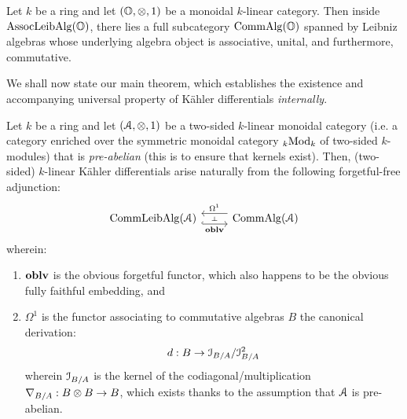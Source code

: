                     \begin{remark} \label{remark: commutative_leibniz_algebras}
                        Let $k$ be a ring and let $(\O, \tensor, 1)$ be a monoidal $k$-linear category. Then inside $\mathrm{Assoc}\mathrm{Leib}\mathrm{Alg}(\mathbb{O})$, there lies a full subcategory $\mathrm{Comm}\mathrm{Alg}(\mathbb{O})$ spanned by Leibniz algebras whose underlying algebra object is associative, unital, and furthermore, commutative.
                    \end{remark}
                    
                    We shall now state our main theorem, which establishes the existence and accompanying universal property of K\"ahler differentials \textit{internally}.
                    \begin{theorem} \label{theorem: kahler_differentials_universal_property}
                        Let $k$ be a ring and let $(\calA, \tensor, 1)$ be a two-sided $k$-linear monoidal category (i.e. a category enriched over the symmetric monoidal category ${}_k\mathrm{Mod}_k$ of two-sided $k$-modules) that is \textit{pre-abelian} (this is to ensure that kernels exist). Then, (two-sided) $k$-linear K\"ahler differentials arise naturally from the following forgetful-free adjunction:
                            $$
                                \begin{tikzcd}
                                	{\Comm\Leib\Alg(\calA)} & {\Comm\Alg(\calA)}
                                	\arrow[""{name=0, anchor=center, inner sep=0}, "\oblv"', shift right=2, hook, from=1-1, to=1-2]
                                	\arrow[""{name=1, anchor=center, inner sep=0}, "{\Omega^1}"', shift right=2, from=1-2, to=1-1]
                                	\arrow["\dashv"{anchor=center, rotate=-90}, draw=none, from=1, to=0]
                                \end{tikzcd}
                            $$
                        wherein:
                            \begin{enumerate}
                                \item $\mathbf{oblv}$ is the obvious forgetful functor, which also happens to be the obvious fully faithful embedding, and
                                \item $\Omega^1$ is the functor associating to commutative algebras $B$ the canonical derivation:
                                    $$d: B \to \mathcal{I}_{B/A}/\mathcal{I}_{B/A}^2$$
                                wherein $\mathcal{I}_{B/A}$ is the kernel of the codiagonal/multiplication $\nabla_{B/A}: B \tensor B \to B$, which exists thanks to the assumption that $\mathcal{A}$ is pre-abelian.
                            \end{enumerate}
                    \end{theorem}
